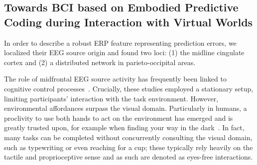 
\subsection{Towards BCI based on Embodied Predictive Coding during Interaction with Virtual Worlds}

In order to describe a robust ERP feature representing prediction errors, we localized their EEG source origin and found two loci: (1) the midline cingulate cortex and (2) a distributed network in parieto-occipital areas. 

The role of midfrontal EEG source activity has frequently been linked to cognitive control processes~\cite{Ridderinkhof2004-rz, Cavanagh2014-mm, Cooper2019-im}. Crucially, these studies employed a stationary setup, limiting participants' interaction with the task environment. However, environmental affordances surpass the visual domain. Particularly in humans, a proclivity to use both hands to act on the environment has emerged and is greatly trusted upon, for example when finding your way in the dark~\cite{Gehrke2018-jm, Gehrke2021-ml, Miyakoshi2021-ni}. In fact, many tasks can be completed without concurrently consulting the visual domain, such as typewriting or even reaching for a cup; these typically rely heavily on the tactile and proprioceptive sense and as such are denoted as eyes-free interactions.

